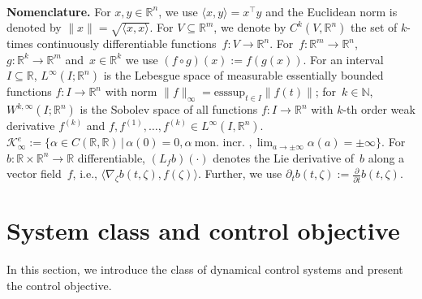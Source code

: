 \documentclass[journal,twoside,web]{ieeeconf}
\newcommand{\R}{\mathbb{R}}
\newcommand{\N}{\mathbb{N}}
\begin{document}
\ \\
\textbf{Nomenclature.}
For $x,y \in \R^n$, we use $\langle x, y \rangle = x ^\top y$ and the Euclidean norm is denoted by $\|x\| = \sqrt{\langle x,x \rangle}$. 
For $V \subseteq \R^m$, we denote by $C^k(V,\R^n)$ the set of $k$-times continuously differentiable functions~$f: V \to \R^n$.
For~$f:\R^m \to \R^n$,~$g:\R^k \to \R^m$ and~$x\in\R^k$ we use $(f \circ g)(x) := f(g(x))$.
For an interval~$I \subseteq \R$, $L^\infty(I; \R^{n})$ is the Lebesgue space of measurable essentially bounded functions $f : I\to\R^n$ with norm $\|f \|_{\infty} = \text{esssup}_{t \in I} \|f(t)\|$; for~$k \in \N$, $W^{k,\infty}(I;\R^{n})$ is the Sobolev space of all functions $f:I\to\R^n$ with $k$-th order weak derivative $f^{(k)}$ and $f,f^{(1)},\ldots,f^{(k)}\in L^\infty(I, \R^{n})$.
$\mathcal{K}_\infty^e := \{ \alpha \in C(\R,\R) \, | \, \alpha(0) = 0, \alpha\ \text{mon.\ incr.\ }, \lim_{a\to \pm \infty}\alpha(a) = \pm \infty \}$.
For $b: \R \times \R^n \to \R$ differentiable, $(L_f b)(\cdot)$ denotes the Lie derivative of~$b$ along a vector field~$f$, i.e., $\langle \nabla_\zeta b(t,\zeta), f(\zeta) \rangle$.
Further, we use $\partial_t b(t,\zeta) := \tfrac{\partial}{\partial t}b(t,\zeta)$.


\section{System class and control objective}
In this section, we introduce the class of dynamical control systems and present the control objective. 
\end{document}
